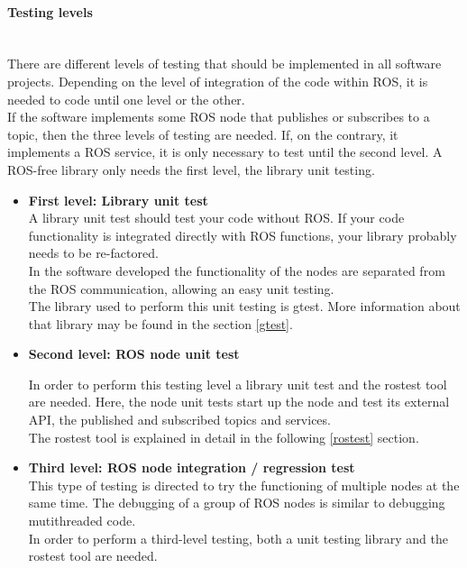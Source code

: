 		\paragraph {Testing levels}\mbox{} \\

		There are different levels of testing that should be implemented in all software projects. Depending on the level of integration of the code within ROS, it is needed to code until one level or the other. 		\\

		If the software implements some ROS node that publishes or subscribes to a topic, then the three levels of testing are needed. If, on the contrary, it implements a ROS service, it is only necessary to test until the second level. A ROS-free library only needs the first level, the library unit testing. 
		\begin{itemize}

			\item{\textbf{First level: Library unit test}}\\

		A library unit test should test your code without ROS. If your code functionality is integrated directly with ROS functions, your library probably needs to be re-factored. 
		\\

		In the software developed the functionality of the nodes are separated from the ROS communication, allowing an easy unit testing. \\

		The library used to perform this unit testing is gtest. More information about that library may be found in the section \ref{gtest}.

			\item{\textbf{Second level: ROS node unit test\\}}

		In order to perform this testing level a library unit test and the rostest tool are needed. Here, the node unit tests start up the node and test its external API, the published and subscribed topics and services. 
		\\

		The rostest tool is explained in detail in the following \ref{rostest} section.

			\item{\textbf{Third level: ROS node integration / regression test}}\\

			This type of testing is directed to try the functioning of multiple nodes at the same time. 
			The debugging of a group of ROS nodes is similar to debugging mutithreaded code. \\

			In order to perform a third-level testing, both a unit testing library and the rostest tool are needed. 
		\end{itemize}

